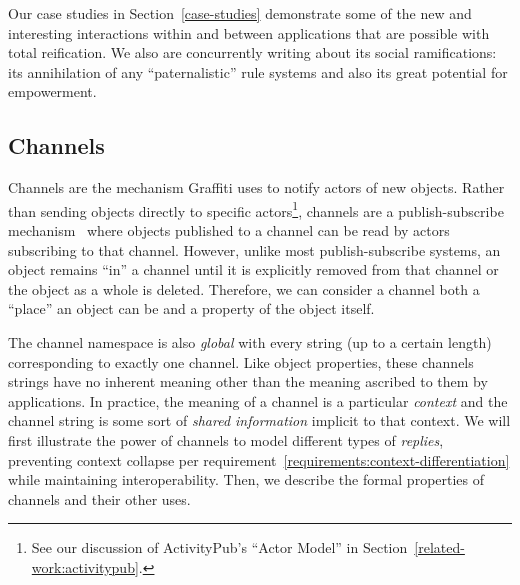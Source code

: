 Our case studies in Section~\ref{case-studies} demonstrate
some of the new and interesting interactions within and between applications
that are possible with total reification.
We also are concurrently writing about its social
ramifications: its annihilation of any ``paternalistic''
rule systems and also its great potential for empowerment.




\subsection{Channels}
\label{concepts:channels}

Channels are the mechanism Graffiti uses to notify
actors of new objects.
Rather than sending objects directly to specific actors\footnote{
    See our discussion of ActivityPub's ``Actor Model'' in Section~\ref{related-work:activitypub}.
},
channels are a publish-subscribe mechanism~\cite{pubsub}
where objects published to a channel
can be read by actors subscribing to that channel.
However, unlike most publish-subscribe systems,
an object remains ``in'' a channel until
it is explicitly removed from that channel
or the object as a whole is deleted.
Therefore, we can consider a channel both a ``place''
an object can be and a property of the object itself.

The channel namespace is also \emph{global} with every string (up to a certain length)
corresponding to exactly one channel.
Like object properties, these channels strings have no inherent meaning
other than the meaning ascribed to them by applications.
In practice, the meaning of a channel is a particular \emph{context} and the channel
string is some sort of \emph{shared information} implicit to that context.
We will first illustrate the power of channels
to model different types of \emph{replies},
preventing context collapse per requirement~\ref{requirements:context-differentiation}
while maintaining interoperability.
Then, we describe the formal properties of channels and their other uses.

